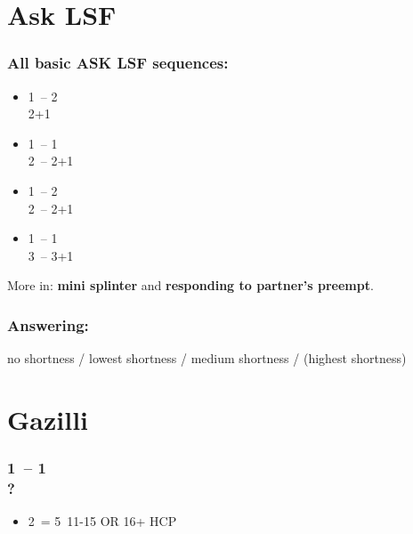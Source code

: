 \section{\texorpdfstring{Ask LSF}{askLSF}}\label{sec:askLSF}

\subsubsection*{All basic ASK LSF sequences:}
\begin{itemize}
    \item 1\majs\ -- 2\majs\ \\ 2\majs+1\alrts
    \item 1\minor\ -- 1\majs\ \\ 2\majs\ -- 2\majs+1\alrts
    \item 1\majs\ -- 2 \\ 2\majs\ -- 2\majs+1\alrts
    \item 1\minor\ -- 1\majs \\ 3\majs\ -- 3\majs+1\alrts
\end{itemize}

More in: \textbf{mini splinter} and \textbf{responding to partner's preempt}.

\subsubsection*{Answering:}

no shortness / lowest shortness / medium shortness / (highest shortness)

\section{\texorpdfstring{Gazilli}{gazilli}}\label{sec:gazilli}

\subsubsection*{1\hearts\ -- 1\spades\ \\ ?}
\begin{itemize}
    \item 2\clubs\ = 5\hearts\clubs\ 11-15 OR 16+ HCP \fonce
\end{itemize}


